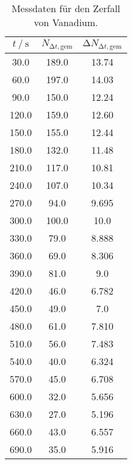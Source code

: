 \begin{table}
 \centering
 \caption{Messdaten für den Zerfall von Vanadium.}
 \label{tab:vanwerte}
 \begin{tabular}{c c c}
  \toprule
  {$t \mathbin{/} \si{\s}$} & {$N_{\increment t, \text{gem}}$} & {$\increment N_{\increment t, \text{gem}}$}\\
  \midrule
  30.0                 & 189.0                & 13.74  \\
  60.0                 & 197.0                & 14.03  \\
  90.0                 & 150.0                & 12.24  \\
  120.0                & 159.0                & 12.60  \\
  150.0                & 155.0                & 12.44  \\
  180.0                & 132.0                & 11.48  \\
  210.0                & 117.0                & 10.81  \\
  240.0                & 107.0                & 10.34  \\
  270.0                & 94.0                 & 9.695  \\
  300.0                & 100.0                & 10.0   \\
  330.0                & 79.0                 & 8.888  \\
  360.0                & 69.0                 & 8.306  \\
  390.0                & 81.0                 & 9.0    \\
  420.0                & 46.0                 & 6.782  \\
  450.0                & 49.0                 & 7.0    \\
  480.0                & 61.0                 & 7.810  \\
  510.0                & 56.0                 & 7.483  \\
  540.0                & 40.0                 & 6.324  \\
  570.0                & 45.0                 & 6.708  \\
  600.0                & 32.0                 & 5.656  \\
  630.0                & 27.0                 & 5.196  \\
  660.0                & 43.0                 & 6.557  \\
  690.0                & 35.0                 & 5.916  \\

\end{tabular}
\end{table}

